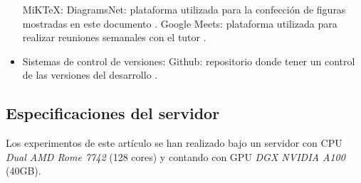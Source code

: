 \begin{itemize}
                    \subitem MiKTeX:
                    \subitem DiagramsNet: plataforma utilizada para la confección de figuras mostradas en este documento \cite{DiagramsNet}. 
                    \subitem Google Meets: plataforma utilizada para realizar reuniones semanales con el tutor \cite{GoogleMeet}.
                \item Sistemas de control de versiones:
                    \subitem Github: repositorio donde tener un control de las versiones del desarrollo \cite{Github}.
                    
            \end{itemize}


        \subsection{Especificaciones del servidor}
            Los experimentos de este artículo se han realizado bajo un servidor con CPU \textit{Dual AMD Rome 7742} (128 cores) y contando con GPU \textit{DGX NVIDIA A100} (40GB).
            